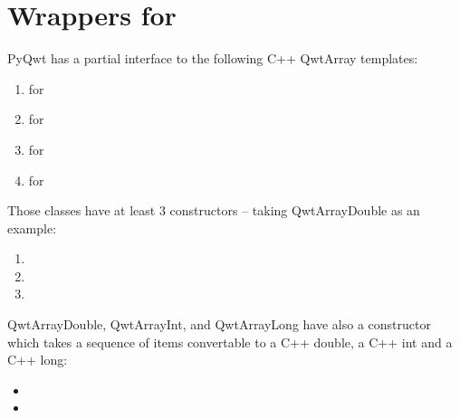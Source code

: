 \documentclass{manual}
\newcommand{\Download}{\ulink{download}
  {http://pyqwt.sourceforge.net/download.html}}
\newcommand{\Future}{
  \begin{notice}[warning]
    The documentation is for the future PyQwt-4.2.2 which is only available
    from CVS. The \Download{} page has links for the latest releases.
  \end{notice}
}
\renewcommand{\Future}{}
\begin{document}
\section{Wrappers for  \label{qwtarray}}

\Future{}

PyQwt has a partial interface to the following C++ QwtArray templates:
\begin{enumerate}
\item
   for 
\item
   for 
\item
   for 
\item
   for 
\end{enumerate}

Those classes have at least 3 constructors -- taking QwtArrayDouble as an
example:
\begin{enumerate}
\item
\item
\item
\end{enumerate}

QwtArrayDouble, QwtArrayInt, and QwtArrayLong have also a constructor which
takes a sequence of items convertable to a C++ double, a C++ int and a C++
long:
\begin{itemize}
\item
\item
\end{itemize}
\end{document}
